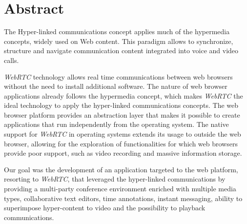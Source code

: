 \chapter*{Abstract}


The Hyper-linked communications concept applies much of the hypermedia concepts, widely used on Web content. This paradigm allows to synchronize, structure and navigate communication content integrated into voice and video calls.


\emph{WebRTC} technology allows real time communications between web browsers without the need to install additional software. The nature of web browser applications already follows the hypermedia concept, which makes \emph{WebRTC} the ideal technology to apply the hyper-linked communications concepts.
The web browser platform provides an abstraction layer that makes it possible to create applications that run independently from the operating system.
The native support for \emph{WebRTC} in operating systems extends its usage to outside the web browser, allowing for the exploration of functionalities for which web browsers provide poor support, such as video recording and massive information storage.



Our goal was the development of an application targeted to the web platform, resorting to \emph{WebRTC}, that leveraged the hyper-linked communications by providing a multi-party conference environment enriched with multiple media types, collaborative text editors, time annotations, instant messaging, ability to superimpose hyper-content to video and the possibility to playback communications.


